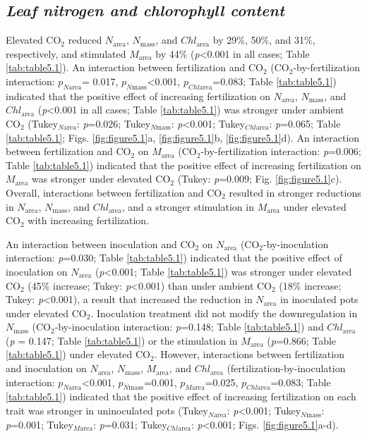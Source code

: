 \subsection{\textit{Leaf nitrogen and chlorophyll content}}
\noindent Elevated CO$_2$ reduced $N_\mathrm{area}$, $N_\mathrm{mass}$, and $Chl_\mathrm{area}$ by 29\%, 50\%, and 31\%, respectively, and stimulated $M_\mathrm{area}$ by 44\% (\textit{p}<0.001 in all cases; Table \ref{tab:table5.1}). An interaction between fertilization and CO$_2$ (CO$_2$-by-fertilization interaction: $p_{N\mathrm{area}}$= 0.017, $p_{N\mathrm{mass}}$<0.001, $p_{Chl\mathrm{area}}$=0.083; Table \ref{tab:table5.1}) indicated that the positive effect of increasing fertilization on $N_\mathrm{area}$, $N_\mathrm{mass}$, and $Chl_\mathrm{area}$ (\textit{p}<0.001 in all cases; Table \ref{tab:table5.1}) was stronger under ambient CO$_2$ (Tukey$_{N\mathrm{area}}$: \textit{p}=0.026; Tukey$_{N\mathrm{mass}}$: \textit{p}<0.001; Tukey$_{Chl\mathrm{area}}$: \textit{p}=0.065; Table \ref{tab:table5.1}; Figs. \ref{fig:figure5.1}a, \ref{fig:figure5.1}b, \ref{fig:figure5.1}d). An interaction between fertilization and CO$_2$ on $M_\mathrm{area}$ (CO$_2$-by-fertilization interaction: \textit{p}=0.006; Table \ref{tab:table5.1}) indicated that the positive effect of increasing fertilization on $M_\mathrm{area}$ was stronger under elevated CO$_2$ (Tukey: \textit{p}=0.009; Fig. \ref{fig:figure5.1}c). Overall, interactions between fertilization and CO$_2$ resulted in stronger reductions in $N_\mathrm{area}$, $N_\mathrm{mass}$, and $Chl_\mathrm{area}$, and a stronger stimulation in $M_\mathrm{area}$ under elevated CO$_2$ with increasing fertilization. 

An interaction between inoculation and CO$_2$ on $N_\mathrm{area}$ (CO$_2$-by-inoculation interaction: \textit{p}=0.030; Table \ref{tab:table5.1}) indicated that the positive effect of inoculation on $N_\mathrm{area}$ (\textit{p}<0.001; Table \ref{tab:table5.1}) was stronger under elevated CO$_2$ (45\% increase; Tukey: \textit{p}<0.001) than under ambient CO$_2$ (18\% increase; Tukey: \textit{p}<0.001), a result that increased the reduction in $N_\mathrm{area}$ in inoculated pots under elevated CO$_2$. Inoculation treatment did not modify the downregulation in $N_\mathrm{mass}$ (CO$_2$-by-inoculation interaction: \textit{p}=0.148; Table \ref{tab:table5.1}) and $Chl_\mathrm{area}$ (\textit{p} = 0.147; Table \ref{tab:table5.1}) or the stimulation in $M_\mathrm{area}$ (\textit{p}=0.866; Table \ref{tab:table5.1}) under elevated CO$_2$. However, interactions between fertilization and inoculation on $N_\mathrm{area}$, $N_\mathrm{mass}$, $M_\mathrm{area}$, and $Chl_\mathrm{area}$ (fertilization-by-inoculation interaction: $p_{N\mathrm{area}}$<0.001, $p_{N\mathrm{mass}}$=0.001, $p_{M\mathrm{area}}$=0.025, $p_{Chl\mathrm{area}}$=0.083; Table \ref{tab:table5.1}) indicated that the positive effect of increasing fertilization on each trait was stronger in uninoculated pots (Tukey$_{N\mathrm{area}}$: \textit{p}<0.001; Tukey$_{N\mathrm{mass}}$: \textit{p}=0.001; Tukey$_{M\mathrm{area}}$: \textit{p}=0.031; Tukey$_{Chl\mathrm{area}}$: \textit{p}<0.001; Figs. \ref{fig:figure5.1}a-d).


